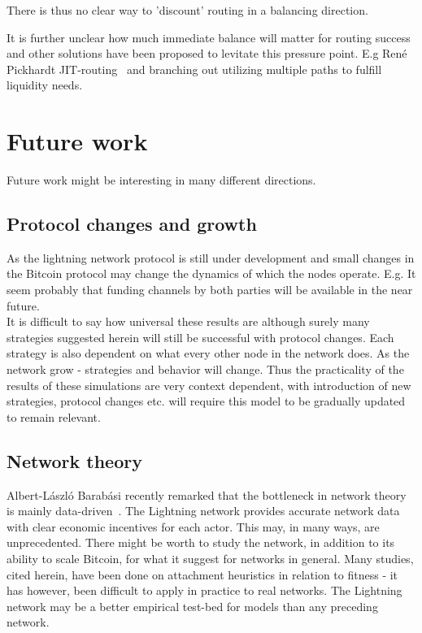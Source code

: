There is thus no clear way to 'discount' routing in a balancing direction.

It is further unclear how much immediate balance will matter for routing success and other solutions have been proposed to levitate this pressure point. E.g René Pickhardt JIT-routing~\cite{pickard:jit} and branching out utilizing multiple paths to fulfill liquidity needs.   

\section{Future work}

Future work might be interesting in many different directions.

\subsection{Protocol changes and growth}

As the lightning network protocol is still under development and small changes in the Bitcoin protocol may change the dynamics of which the nodes operate. E.g. It seem probably that funding channels by both parties will be available in the near future. \\

It is difficult to say how universal these results are although surely many strategies suggested herein will still be successful with protocol changes. Each strategy is also dependent on what every other node in the network does. As the network grow - strategies and behavior will change. Thus the practicality of the results of these simulations are very context dependent, with introduction of new strategies, protocol changes etc. will require this model to be gradually updated to remain relevant.  

\subsection{Network theory}

Albert-László Barabási recently remarked that the bottleneck in network theory is mainly data-driven~\cite{barabasi:decade:beyond}. The Lightning network provides accurate network data with clear economic incentives for each actor. This may, in many ways, are unprecedented. There might be worth to study the network, in addition to its ability to scale Bitcoin, for what it suggest for networks in general. Many studies, cited herein, have been done on attachment heuristics in relation to fitness - it has however, been difficult to apply in practice to real networks. The Lightning network may be a better empirical test-bed for models than any preceding network. 

